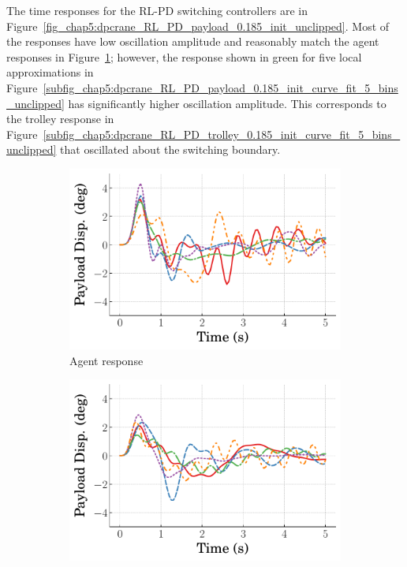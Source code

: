 The time responses for the RL-PD switching controllers are in Figure~\ref{fig_chap5:dpcrane_RL_PD_payload_0.185_init_unclipped}. Most of the responses have low oscillation amplitude and reasonably match the agent responses in Figure~\ref{subfig_chap5:dpcrane_RL_PD_payload_0.185_init_agent_unclipped}; however, the response shown in green for five local approximations in Figure~\ref{subfig_chap5:dpcrane_RL_PD_payload_0.185_init_curve_fit_5_bins_unclipped} has significantly higher oscillation amplitude. This corresponds to the trolley response in Figure~\ref{subfig_chap5:dpcrane_RL_PD_trolley_0.185_init_curve_fit_5_bins_unclipped} that oscillated about the switching boundary.
%
\begin{figure}
    \centering
    \begin{subfigure}[b]{0.32\textwidth}
        \centering
        \includegraphics[width=\textwidth]{figures/figures_Interpretability/Mean_ISE_dpcrane_cubic_1_bins/curve_fit_time_responses/RL_PD/agent_0p18_Payload_Disp.pdf}
        \caption{Agent response}
        \label{subfig_chap5:dpcrane_RL_PD_payload_0.185_init_agent_unclipped}
    \end{subfigure}
    \hfill
    \begin{subfigure}[b]{0.32\textwidth}
        \centering
        \includegraphics[width=\textwidth]{figures/figures_Interpretability/Mean_ISE_dpcrane_cubic_1_bins/curve_fit_time_responses/RL_PD/curve_fit_0p18_Payload_Disp.pdf}

\end{subfigure}
\end{figure}
